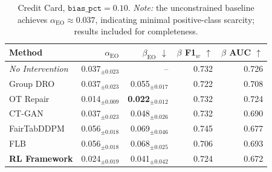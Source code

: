 \begin{table}[ht]
  \centering
  \small
  \caption{Credit Card, $\texttt{bias\_pct}=0.10$. \textit{Note:} the unconstrained baseline achieves $\alpha_\text{EO} \approx 0.037$, indicating minimal positive-class scarcity; results included for completeness.}
  \label{tab:credit_b010}
  \begin{tabular}{lrrrr}
    \toprule
    \textbf{Method} & $\alpha_\text{EO}$ & $\beta_\text{EO}$ $\downarrow$ & $\beta$ F1$_w$ $\uparrow$ & $\beta$ AUC $\uparrow$ \\
    \midrule
    \textit{No Intervention} & 0.037$_{\pm 0.023}$ & -- & 0.732 & 0.726 \\
    \midrule
    Group DRO & 0.037$_{\pm 0.023}$ & 0.055$_{\pm 0.017}$ & 0.722 & 0.708 \\
    OT Repair & 0.014$_{\pm 0.009}$ & \textbf{0.022$_{\pm 0.012}$} & 0.732 & 0.724 \\
    CT-GAN & 0.037$_{\pm 0.023}$ & 0.048$_{\pm 0.026}$ & 0.732 & 0.690 \\
    FairTabDDPM & 0.056$_{\pm 0.018}$ & 0.069$_{\pm 0.046}$ & 0.745 & 0.677 \\
    FLB & 0.056$_{\pm 0.018}$ & 0.068$_{\pm 0.025}$ & 0.706 & 0.693 \\
    \textbf{RL Framework} & 0.024$_{\pm 0.019}$ & 0.041$_{\pm 0.042}$ & 0.724 & 0.672 \\
    \bottomrule
  \end{tabular}
\end{table}